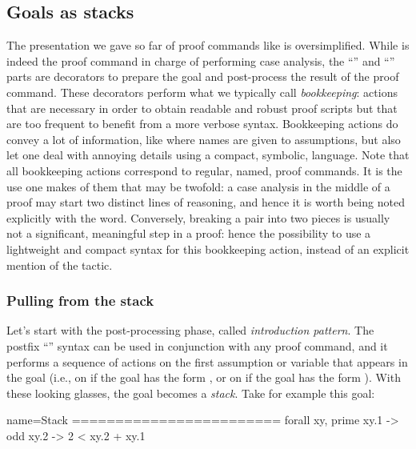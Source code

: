 \subsection{Goals as stacks}\label{ssec:stack}

The presentation we gave so far of proof commands like 
is oversimplified.  While  is indeed the proof command in
charge of performing case analysis, the ``'' and ``\C{=> [|m]}''
parts are decorators to prepare the goal and post-process the result of
the proof command.  These decorators perform what we typically call
\emph{bookkeeping}: actions that are necessary in order to obtain readable and
robust proof scripts but that are too frequent to benefit from a more verbose
syntax.  Bookkeeping actions do convey a lot of information, like where
names are given to assumptions, but also let one deal with annoying details
using a compact, symbolic, language.  Note that all bookkeeping actions
correspond to regular, named, proof commands.  It is the use one makes of them
that may be twofold: a case analysis in the middle of a proof may start two
distinct lines of reasoning, and hence it is worth being noted explicitly with
the  word. Conversely, breaking a pair into two pieces is
usually not a significant, meaningful step in a proof: hence the
possibility to use a lightweight and compact syntax for this bookkeeping
action, instead of an explicit mention of the  tactic.

\subsubsection{Pulling from the stack}

Let's start with the post-processing phase, called \emph{introduction pattern}.
The postfix ``'' syntax can be used in conjunction with any proof
command, and it performs a sequence of actions on the first
assumption or variable that appears in the goal (i.e., on
 if the goal has the form , or on
 if the goal has the form ).
With these looking glasses, the goal becomes a
\emph{stack}. Take for example this goal:

\begin{coqout}{name=Stack}{}
========================
forall xy, prime xy.1 -> odd xy.2 -> 2 < xy.2 + xy.1
\end{coqout}

